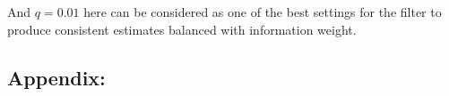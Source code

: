 \documentclass[a4paper]{article}
\begin{document}
\noindent And $q=0.01$ here can be considered as one of the best settings for the filter to produce consistent estimates balanced with information weight. \\

\newpage
\subsection*{Appendix:}






\end{document}
